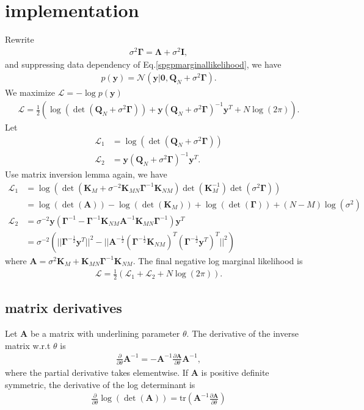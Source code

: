 \documentclass[10pt,a4paper]{article}
\begin{document}
\section{implementation}
Rewrite
\begin{align}
\sigma^2\pmb{\Gamma}=\pmb{\Lambda}+\sigma^2\pmb{I},
\end{align}
and suppressing data dependency of Eq.\ref{spgpmarginallikelihood}, we have
\begin{align}
p(\pmb{y})=\mathcal{N}(\pmb{y}|\pmb{0},\pmb{Q}_N+\sigma^2\pmb{\Gamma}).
\end{align}
We maximize $\mathcal{L}=-\log p(\pmb{y})$
\begin{align}
\mathcal{L}=\frac{1}{2}(\log(\det(\pmb{Q}_N+\sigma^2\pmb{\Gamma}))+\pmb{y}(\pmb{Q}_N+\sigma^2\pmb{\Gamma})^{-1}\pmb{y}^T +N\log(2\pi)).
\end{align}
Let
\begin{align}
\mathcal{L}_1&=\log(\det(\pmb{Q}_N+\sigma^2\pmb{\Gamma}))\\
\mathcal{L}_2&=\pmb{y}(\pmb{Q}_N+\sigma^2\pmb{\Gamma})^{-1}\pmb{y}^T.
\end{align}
Use matrix inversion lemma again, we have
\begin{align}
\mathcal{L}_1&=\log(\det(\pmb{K}_M+\sigma^{-2}\pmb{K}_{MN}\pmb{\Gamma}^{-1}\pmb{K}_{NM})\det(\pmb{K}_M^{-1})\det(\sigma^2\pmb{\Gamma}))\nonumber\\
&=\log(\det(\pmb{A}))-\log(\det(\pmb{K}_M))+\log(\det(\pmb{\Gamma}))+(N-M)\log(\sigma^2)\\
\mathcal{L}_2&=\sigma^{-2}\pmb{y}(\pmb{\Gamma}^{-1}-\pmb{\Gamma}^{-1}\pmb{K}_{NM}\pmb{A}^{-1}\pmb{K}_{MN}\pmb{\Gamma}^{-1})\pmb{y}^T\\
&=\sigma^{-2}(||\pmb{\Gamma}^{-\frac{1}{2}}\pmb{y}^T||^2-||\pmb{A}^{-\frac{1}{2}}(\pmb{\Gamma}^{-\frac{1}{2}}\pmb{K}_{NM})^T(\pmb{\Gamma}^{-\frac{1}{2}}\pmb{y}^T)^T||^2)
\end{align}
where $\pmb{A}=\sigma^2\pmb{K}_M+\pmb{K}_{MN}\pmb{\Gamma}^{-1}\pmb{K}_{NM}$. The final negative log marginal likelihood is 
\begin{align}
\mathcal{L}=\frac{1}{2}(\mathcal{L}_1+\mathcal{L}_2+N\log(2\pi)).
\end{align}
\subsection{matrix derivatives}
Let $\pmb{A}$ be a matrix with underlining parameter $\theta$. The derivative of the inverse matrix w.r.t $\theta$ is
\begin{align}
\frac{\partial}{\partial\theta}\pmb{A}^{-1}=-\pmb{A}^{-1}\frac{\partial\pmb{A}}{\partial\theta}\pmb{A}^{-1},
\end{align}
where the partial derivative takes elementwise. If $\pmb{A}$ is positive definite symmetric, the derivative of the log determinant is
\begin{align}
\frac{\partial}{\partial\theta}\log(\det(\pmb{A}))=\mathrm{tr}(\pmb{A}^{-1}\frac{\partial\pmb{A}}{\partial\theta})
\end{align}
\end{document}
